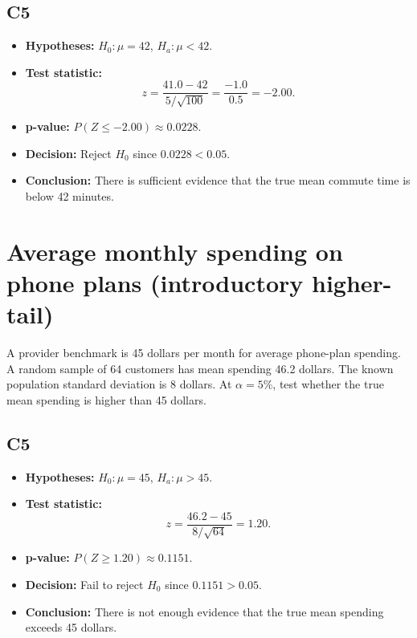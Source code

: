 \subsection*{C5}
\begin{itemize}
    \item \textbf{Hypotheses:} \(H_0\colon \mu=42\), \(H_a\colon \mu<42\).
    \item \textbf{Test statistic:}
    \[
    z=\frac{41.0-42}{5/\sqrt{100}}=\frac{-1.0}{0.5}=-2.00.
    \]
    \item \textbf{p-value:} \(P(Z\le -2.00)\approx 0.0228\).
    \item \textbf{Decision:} Reject \(H_0\) since \(0.0228<0.05\).
    \item \textbf{Conclusion:} There is sufficient evidence that the true mean commute time is below 42 minutes.
\end{itemize}

\begin{center}
\end{center}

\section{Average monthly spending on phone plans (introductory higher-tail)}
A provider benchmark is 45 dollars per month for average phone-plan spending. A random sample of 64 customers has mean spending 46.2 dollars. The known population standard deviation is 8 dollars. At \(\alpha=5\%\), test whether the true mean spending is higher than 45 dollars.

\subsection*{C5}
\begin{itemize}
    \item \textbf{Hypotheses:} \(H_0\colon \mu=45\), \(H_a\colon \mu>45\).
    \item \textbf{Test statistic:}
    \[
    z=\frac{46.2-45}{8/\sqrt{64}}=1.20.
    \]
    \item \textbf{p-value:} \(P(Z\ge 1.20)\approx 0.1151\).
    \item \textbf{Decision:} Fail to reject \(H_0\) since \(0.1151>0.05\).
    \item \textbf{Conclusion:} There is not enough evidence that the true mean spending exceeds 45 dollars.
\end{itemize}

